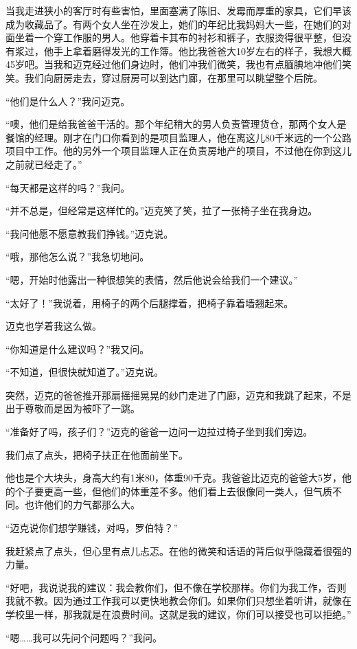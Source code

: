 当我走进狭小的客厅时有些害怕，里面塞满了陈旧、发霉而厚重的家具，它们早该成为收藏品了。有两个女人坐在沙发上，她们的年纪比我妈妈大一些，在她们的对面坐着一个穿工作服的男人。他穿着卡其布的衬衫和裤子，衣服烫得很平整，但没有浆过，他手上拿着磨得发光的工作簿。他比我爸爸大10岁左右的样子，我想大概45岁吧。当我和迈克经过他们身边时，他们冲我们微笑，我也有点腼腆地冲他们笑笑。我们向厨房走去，穿过厨房可以到达门廊，在那里可以眺望整个后院。

“他们是什么人？”我问迈克。

“噢，他们是给我爸爸干活的。那个年纪稍大的男人负责管理货仓，那两个女人是餐馆的经理。刚才在门口你看到的是项目监理人，他在离这儿80千米远的一个公路项目中工作。他的另外一个项目监理人正在负责房地产的项目，不过他在你到这儿之前就已经走了。”

“每天都是这样的吗？”我问。

“并不总是，但经常是这样忙的。”迈克笑了笑，拉了一张椅子坐在我身边。

“我问他愿不愿意教我们挣钱。”迈克说。

“哦，那他怎么说？”我急切地问。

“嗯，开始时他露出一种很想笑的表情，然后他说会给我们一个建议。”

“太好了！”我说着，用椅子的两个后腿撑着，把椅子靠着墙翘起来。

迈克也学着我这么做。

“你知道是什么建议吗？”我又问。

“不知道，但很快就知道了。”迈克说。

突然，迈克的爸爸推开那扇摇摇晃晃的纱门走进了门廊，迈克和我跳了起来，不是出于尊敬而是因为被吓了一跳。

“准备好了吗，孩子们？”迈克的爸爸一边问一边拉过椅子坐到我们旁边。

我们点了点头，把椅子扶正在他面前坐下。

他也是个大块头，身高大约有1米80，体重90千克。我爸爸比迈克的爸爸大5岁，他的个子要更高一些，但他们的体重差不多。他们看上去很像同一类人，但气质不同。也许他们的力气都那么大。

“迈克说你们想学赚钱，对吗，罗伯特？”

我赶紧点了点头，但心里有点儿忐忑。在他的微笑和话语的背后似乎隐藏着很强的力量。

“好吧，我说说我的建议：我会教你们，但不像在学校那样。你们为我工作，否则我就不教。因为通过工作我可以更快地教会你们。如果你们只想坐着听讲，就像在学校里一样，那我就是在浪费时间。这就是我的建议，你们可以接受也可以拒绝。”

“嗯……我可以先问个问题吗？”我问。

